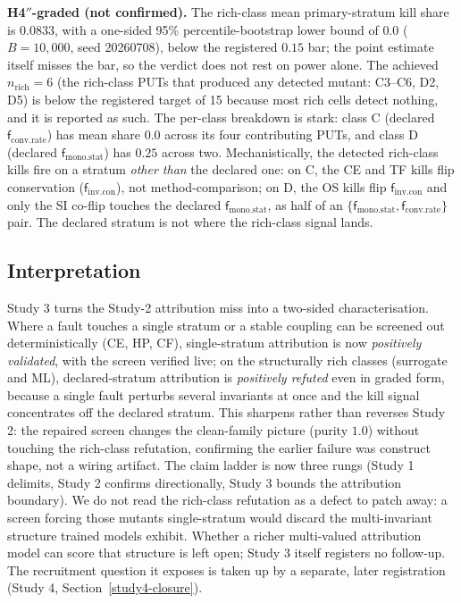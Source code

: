 \documentclass[manuscript,screen,review]{acmart}
\begin{document}
\textbf{H4\('' \)-graded (not confirmed).} The rich-class mean primary-stratum
kill share is \(0.0833\), with a one-sided 95\% percentile-bootstrap lower bound
of \(0.0\) (\(B = 10{,}000\), seed 20260708), below the registered \(0.15\) bar;
the point estimate itself misses the bar, so the verdict does not rest on power
alone. The achieved \(n_{\mathrm{rich}} = 6\) (the rich-class PUTs that produced
any detected mutant: C3--C6, D2, D5) is below the registered target of 15
because most rich cells detect nothing, and it is reported as such. The
per-class breakdown is stark: class C (declared \(\mathsf{f}_{\mathrm{conv.rate}}\)) has mean
share \(0.0\) across its four contributing PUTs, and class D (declared
\(\mathsf{f}_{\mathrm{mono.stat}}\)) has \(0.25\) across two. Mechanistically, the detected
rich-class kills fire on a stratum \emph{other than} the declared one:
on C, the CE and TF kills flip conservation (\(\mathsf{f}_{\mathrm{inv.con}}\)), not
method-comparison; on D, the OS kills flip \(\mathsf{f}_{\mathrm{inv.con}}\) and only the SI
co-flip touches the declared \(\mathsf{f}_{\mathrm{mono.stat}}\), as half of an
\(\{\mathsf{f}_{\mathrm{mono.stat}}, \mathsf{f}_{\mathrm{conv.rate}}\}\) pair. The declared stratum is not
where the rich-class signal lands.

\subsection{Interpretation}\label{study3-interpretation}

Study 3 turns the Study-2 attribution miss into a two-sided characterisation.
Where a fault touches a single stratum or a stable coupling can be screened out
deterministically (CE, HP, CF), single-stratum attribution is now
\emph{positively validated}, with the screen verified live; on the structurally
rich classes (surrogate and ML), declared-stratum attribution is
\emph{positively refuted} even in graded form, because a single fault perturbs
several invariants at once and the kill signal concentrates off the declared
stratum. This sharpens rather than reverses Study 2: the repaired screen
changes the clean-family picture (purity \(1.0\)) without touching the
rich-class refutation, confirming the earlier failure was construct shape, not a
wiring artifact. The claim ladder is now three rungs (Study 1 delimits, Study 2
confirms directionally, Study 3 bounds the attribution boundary). We do not read
the rich-class refutation as a defect to patch away: a screen forcing those
mutants single-stratum would discard the multi-invariant structure trained
models exhibit. Whether a richer multi-valued attribution model can score that
structure is left open; Study 3 itself registers no follow-up. The recruitment
question it exposes is taken up by a separate, later registration (Study 4,
Section~\ref{study4-closure}).
\end{document}
